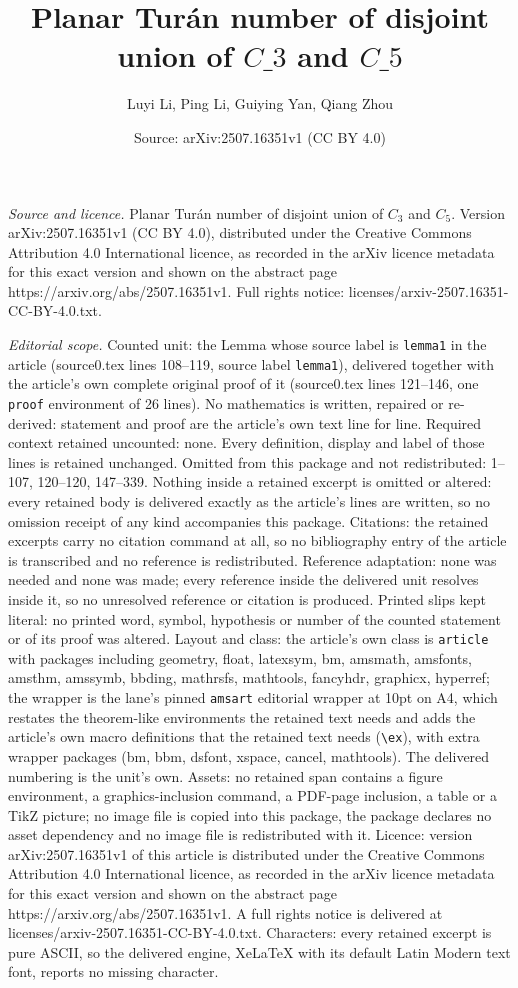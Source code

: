 \documentclass[10pt,a4paper]{amsart}
\title[Planar Tur\'an number of disjoint union of $C\_3$ and $C\_5$]{Planar Tur\'an number of disjoint union of $C\_3$ and $C\_5$}
\author{Luyi Li, Ping Li, Guiying Yan, Qiang Zhou}
\date{Source: arXiv:2507.16351v1 (CC BY 4.0)}
\begin{document}
\maketitle

\noindent\emph{Source and licence.} Planar Tur\'an number of disjoint union of $C_3$ and $C_5$. Version arXiv:2507.16351v1 (CC BY 4.0), distributed under the Creative Commons Attribution 4.0 International licence, as recorded in the arXiv licence metadata for this exact version and shown on the abstract page https://arxiv.org/abs/2507.16351v1. Full rights notice: licenses/arxiv-2507.16351-CC-BY-4.0.txt.\par\smallskip

\noindent\textit{Editorial scope.} Counted unit: the Lemma whose source label is \texttt{lemma1} in the article (source0.tex lines 108--119, source label \texttt{lemma1}), delivered together with the article's own complete original proof of it (source0.tex lines 121--146, one \texttt{proof} environment of 26 lines). No mathematics is written, repaired or re-derived: statement and proof are the article's own text line for line. Required context retained uncounted: none. Every definition, display and label of those lines is retained unchanged. Omitted from this package and not redistributed: 1--107, 120--120, 147--339. Nothing inside a retained excerpt is omitted or altered: every retained body is delivered exactly as the article's lines are written, so no omission receipt of any kind accompanies this package. Citations: the retained excerpts carry no citation command at all, so no bibliography entry of the article is transcribed and no reference is redistributed. Reference adaptation: none was needed and none was made; every reference inside the delivered unit resolves inside it, so no unresolved reference or citation is produced. Printed slips kept literal: no printed word, symbol, hypothesis or number of the counted statement or of its proof was altered. Layout and class: the article's own class is \texttt{article} with packages including geometry, float, latexsym, bm, amsmath, amsfonts, amsthm, amssymb, bbding, mathrsfs, mathtools, fancyhdr, graphicx, hyperref; the wrapper is the lane's pinned \texttt{amsart} editorial wrapper at 10pt on A4, which restates the theorem-like environments the retained text needs and adds the article's own macro definitions that the retained text needs (\texttt{\textbackslash ex}), with extra wrapper packages (bm, bbm, dsfont, xspace, cancel, mathtools). The delivered numbering is the unit's own. Assets: no retained span contains a figure environment, a graphics-inclusion command, a PDF-page inclusion, a table or a TikZ picture; no image file is copied into this package, the package declares no asset dependency and no image file is redistributed with it. Licence: version arXiv:2507.16351v1 of this article is distributed under the Creative Commons Attribution 4.0 International licence, as recorded in the arXiv licence metadata for this exact version and shown on the abstract page https://arxiv.org/abs/2507.16351v1. A full rights notice is delivered at licenses/arxiv-2507.16351-CC-BY-4.0.txt. Characters: every retained excerpt is pure ASCII, so the delivered engine, XeLaTeX with its default Latin Modern text font, reports no missing character.
\end{document}
